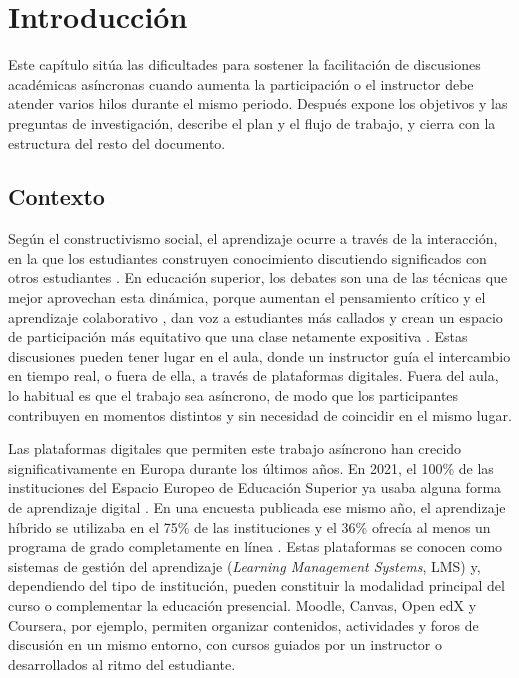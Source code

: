 \chapter{Introducción}
\label{chap:introduccion}

Este capítulo sitúa las dificultades para sostener la facilitación de discusiones académicas asíncronas cuando aumenta la participación o el instructor debe atender varios hilos durante el mismo periodo. Después expone los objetivos y las preguntas de investigación, describe el plan y el flujo de trabajo, y cierra con la estructura del resto del documento.

\section{Contexto}

Según el constructivismo social, el aprendizaje ocurre a través de la interacción, en la que los estudiantes construyen conocimiento discutiendo significados con otros estudiantes \parencite{WooReeves2007}. En educación superior, los debates son una de las técnicas que mejor aprovechan esta dinámica, porque aumentan el pensamiento crítico y el aprendizaje colaborativo \parencite{Brown2015}, dan voz a estudiantes más callados y crean un espacio de participación más equitativo que una clase netamente expositiva \parencite{BineyEkeyi2018,WooReeves2007}. Estas discusiones pueden tener lugar en el aula, donde un instructor guía el intercambio en tiempo real, o fuera de ella, a través de plataformas digitales. Fuera del aula, lo habitual es que el trabajo sea asíncrono, de modo que los participantes contribuyen en momentos distintos y sin necesidad de coincidir en el mismo lugar.

Las plataformas digitales que permiten este trabajo asíncrono han crecido significativamente en Europa durante los últimos años. En 2021, el 100\% de las instituciones del Espacio Europeo de Educación Superior ya usaba alguna forma de aprendizaje digital \parencite{GaebelEtAl2021}. En una encuesta publicada ese mismo año, el aprendizaje híbrido se utilizaba en el 75\% de las instituciones y el 36\% ofrecía al menos un programa de grado completamente en línea \parencite{GaebelEtAl2021}. Estas plataformas se conocen como sistemas de gestión del aprendizaje (\textit{Learning Management Systems}, LMS) y, dependiendo del tipo de institución, pueden constituir la modalidad principal del curso o complementar la educación presencial. Moodle, Canvas, Open edX y Coursera, por ejemplo, permiten organizar contenidos, actividades y foros de discusión en un mismo entorno, con cursos guiados por un instructor o desarrollados al ritmo del estudiante.


